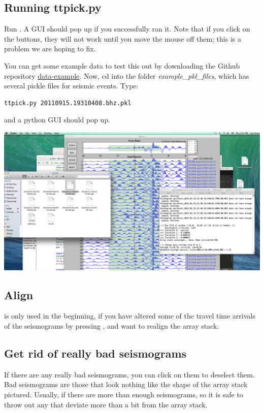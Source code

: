 \documentclass[letterpaper,10pt,english]{sphinxmanual}
\begin{document}
\subsection{Running ttpick.py}
\label{docfiles/PickingTravelTimes:running-ttpick-py}
Run . A GUI should pop up if you successfully ran it. Note that if you click on the buttons, they will not work until you move the mouse off them; this is a problem we are hoping to fix.

You can get some example data to test this out by downloading the Github repository \href{https://github.com/pysmo/data-example}{data-example}. Now, cd into the folder \emph{example\_pkl\_files}, which has several pickle files for seismic events. Type:

\begin{Verbatim}[commandchars=\\\{\}]
ttpick.py 20110915.19310408.bhz.pkl
\end{Verbatim}

and a python GUI should pop up.

\includegraphics{pick_travel_times.png}


\subsection{Align}
\label{docfiles/PickingTravelTimes:align}
 is only used in the beginning, if you have altered some of the travel time arrivals of the seismograms by pressing , and want to realign the array stack.


\subsection{Get rid of really bad seismograms}
\label{docfiles/PickingTravelTimes:get-rid-of-really-bad-seismograms}
If there are any really bad seismograms, you can click on them to deselect them. Bad seismograms are those that look nothing like the shape of the array stack pictured. Usually, if there are more than enough seismograms, so it is safe to throw out any that deviate more than a bit from the array stack.
\end{document}
